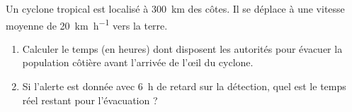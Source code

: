 \documentclass[11pt]{article}
\begin{document}
\begin{exercice}
Un cyclone tropical est localisé à \SI{300}{\kilo\meter} des côtes. Il se déplace à une vitesse moyenne de \SI{20}{\kilo\meter\per\hour} vers la terre.
\begin{enumerate}
    \item Calculer le temps (en heures) dont disposent les autorités pour évacuer la population côtière avant l'arrivée de l'œil du cyclone.
    \item Si l'alerte est donnée avec \SI{6}{\hour} de retard sur la détection, quel est le temps réel restant pour l'évacuation ?
\end{enumerate}
\end{exercice}
\end{document}
